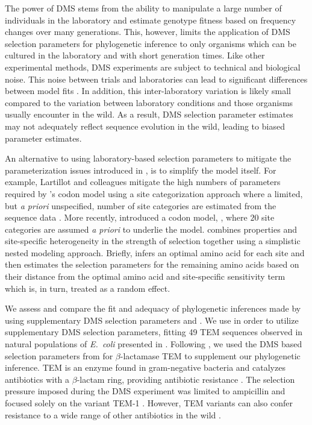 \documentclass[fleqn,letterpaper]{article}
\begin{document}
The power of DMS stems from the ability to manipulate a large number of individuals in the laboratory and estimate genotype fitness based on frequency changes over many generations.
This, however, limits the application of DMS selection parameters for phylogenetic inference to only organisms which can be cultured in the laboratory and with short generation times.
Like other experimental methods, DMS experiments are subject to technical and biological noise.
This noise between trials and laboratories can lead to significant differences between model fits \citep{hilton2017}.
In addition, this inter-laboratory variation is likely small compared to the variation between laboratory conditions and those organisms usually encounter in the wild.
As a result, DMS selection parameter estimates may not adequately reflect sequence evolution in the wild, leading to biased parameter estimates.

An alternative to using laboratory-based selection parameters to mitigate the parameterization issues introduced in \hb, is to simplify the \hb model itself.
For example, Lartillot and colleagues mitigate the high numbers of  parameters required by \hb's codon model using a site categorization approach where a limited, but \emph{a priori} unspecified, number of site categories are estimated from the sequence data \citep{LartillotAndPhilippe2004,le2008,RodrigueEtAl2008,RodrigueAndLartillot2014}.
More recently, \citep{beaulieu2019} introduced a codon model, \selac, where $20$ site categories are assumed \emph{a priori} to underlie the \hb model.
\selac combines \PC properties and site-specific heterogeneity in the strength of selection together using a simplistic nested modeling approach.
Briefly, \selac infers an optimal amino acid for each site and then estimates the selection parameters for the remaining amino acids based on their \PC distance from the optimal amino acid and site-specific sensitivity term which is, in turn, treated as a random effect.

We assess and compare the fit and adequacy of phylogenetic inferences made by \phydms using supplementary DMS selection parameters and \selac. 
We use \phydms \citep{hilton2017} in order to utilize supplementary DMS selection parameters, fitting 49 TEM sequences observed in natural populations of \emph{E.~coli} presented in \citet{bloom2017}.
Following \citet{bloom2017, hilton2017}, we used the DMS based selection parameters from \citet{stiffler2016} for $\beta$-lactamase TEM to supplement our phylogenetic inference.
TEM is an enzyme found in gram-negative bacteria and catalyzes antibiotics with a $\beta$-lactam ring, providing antibiotic resistance \citep{Neu1969}.
The selection pressure imposed during the DMS experiment was limited to ampicillin and focused solely on the variant TEM-1 \citep{stiffler2016}.
However, TEM variants can also confer resistance to a wide range of other antibiotics in the wild \citep{sougakoff1988,sougakoff1989,goussard1991,mabilat1992,chanal1992,brun1994}.
\end{document}
